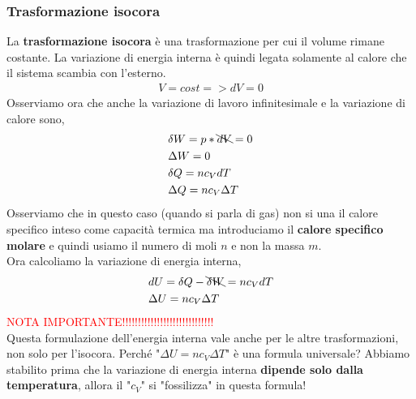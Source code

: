             \subsubsection{Trasformazione isocora}
                La \textbf{trasformazione isocora} è una trasformazione per cui il volume rimane costante. La variazione di energia interna è quindi legata solamente al calore che il sistema scambia con l'esterno.
                \begin{align*}
                    V = cost => dV = 0
                \end{align*}
                Osserviamo ora che anche la variazione di lavoro infinitesimale e la variazione di calore sono,
                \begin{align*}
                    &\delta W = p*\bcancel{dV} = 0\\
                    &\Delta W = 0\\
                    &\delta Q = nc_VdT\\
                    &\Delta Q = nc_V\Delta T
                \end{align*}
                Osserviamo che in questo caso (quando si parla di gas) non si una il calore specifico inteso come capacità termica ma introduciamo il \textbf{calore specifico molare} e quindi usiamo il numero di moli $n$ e non la massa $m$.\\
                Ora calcoliamo la variazione di energia interna,
                \begin{align*}
                    &dU=\delta Q - \bcancel{\delta W} = nc_VdT\\
                    &\Delta U = nc_V\Delta T
                \end{align*}                
                \textcolor{Red}{NOTA IMPORTANTE!!!!!!!!!!!!!!!!!!!!!!!!!!!!!}\\
                Questa formulazione dell'energia interna vale anche per le altre trasformazioni, non solo per l'isocora. Perché "$\Delta U = nc_V\Delta T$" è una formula universale? Abbiamo stabilito prima che la variazione di energia interna \textbf{dipende solo dalla temperatura}, allora il "$c_V$" si "fossilizza" in questa formula!

